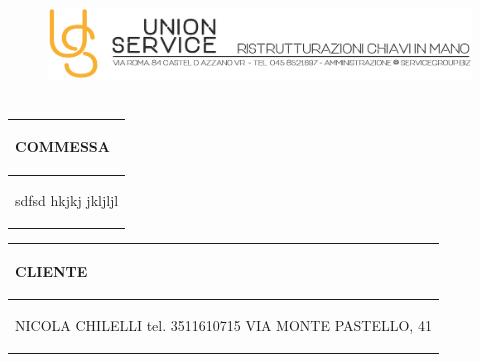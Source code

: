 \documentclass[a4paper]{article}
\begin{document}
                        
                        \begin{figure}[!t]
                        \includegraphics[width=15.8cm, height=3cm]{intestazioneAlta2.jpg}
                        \end{figure}
                        
                        \noindent\begin{tabular}{| L{72.2mm} |}
                            \hline
                            \vspace{2.5mm}
                            \begin{spacing}{0}
                            \textbf{COMMESSA}
                            \end{spacing}\\
                            \hline
                            \vspace{4mm}
                            \begin{spacing}{1.2}

                        sdfsd \newline hkjkj \newline jkljljl
                          \end{spacing}\\
                            \hline
                          \end{tabular}
                          \quad
                          \begin{tabular}{ | R{72.2mm} | }
                            \hline
                            \vspace{2.5mm}
                            \begin{spacing}{0}
                            \textbf{CLIENTE}
                            \end{spacing}\\
                            \hline
                            \vspace{4mm}
                            \begin{spacing}{1.2}
                        
                       NICOLA CHILELLI \newline tel. 3511610715 \newline VIA MONTE PASTELLO, 41
                          \end{spacing}\\
                            \hline
                          \end{tabular}
                        
\end{document}
